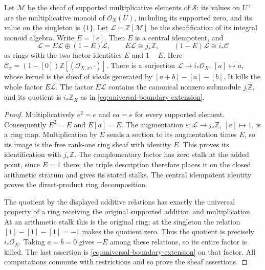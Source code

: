 \begin{proposition}
\label{prop:monoid-linearization}
Let $\mathcal M$ be the sheaf of supported multiplicative elements of
$\mathcal S$: its values on $U^+$ are the multiplicative monoid of
$\mathcal O_X(U)$, including its supported zero, and its value on the
singleton is $\{1\}$. Let $\mathcal L=\mathbb Z[\mathcal M]$ be the
sheafification of its integral monoid algebra. Write $E=[e]$.
Then $E$ is a central idempotent, and
\[
 \mathcal L=E\mathcal L\oplus(1-E)\mathcal L,
 \qquad E\mathcal L\cong j_*\mathbb Z,
 \qquad (1-E)\mathcal L\cong i_*\mathcal C
 \tag{RP19}\label{eq:monoid-splitting}
\]
as rings with the two factor identities $E$ and $1-E$. Here
$\mathcal C_x=(1-[0])\mathbb Z[(\mathcal O_{X,x},\cdot)]$.
There is a surjection $\mathcal L\to i_*\mathcal O_X$, $[a]\mapsto a$,
whose kernel is the sheaf of ideals generated by
$[a+b]-[a]-[b]$. It kills the whole factor $E\mathcal L$.
The factor $E\mathcal L$ contains the canonical nonzero submodule
$j_!\mathbb Z$, and its quotient is $i_*\mathbb Z_X$ as in
\eqref{eq:universal-boundary-extension}.
\end{proposition}
\begin{proof}
Multiplicatively $e^2=e$ and $ea=e$ for every supported element.
Consequently $E^2=E$ and $E[a]=E$. The augmentation
$\varepsilon:\mathcal L\to j_*\mathbb Z$, $[a]\mapsto1$, is a ring
map. Multiplication by $E$ sends a section to its augmentation times
$E$, so its image is the free rank-one ring sheaf with identity $E$.
This proves its identification with $j_*\mathbb Z$. The complementary
factor has zero stalk at the added point, since $E=1$ there; the triple
description therefore places it on the closed arithmetic stratum and
gives its stated stalks. The central idempotent identity proves the
direct-product ring decomposition.

The quotient by the displayed additive relations has exactly the
universal property of a ring receiving the original supported addition
and multiplication. At an arithmetic stalk this is the original ring;
at the singleton the relation $[1]-[1]-[1]=-1$ makes the quotient zero.
Thus the quotient is precisely $i_*\mathcal O_X$. Taking $a=b=0$ gives
$-E$ among these relations, so its entire factor is killed.
The last assertion is \eqref{eq:universal-boundary-extension} on that
factor. All computations commute with restrictions and so prove the
sheaf assertions.
\end{proof}

